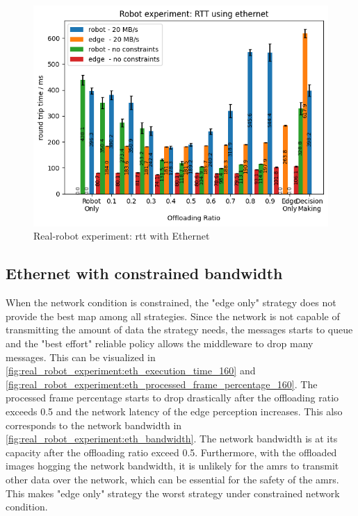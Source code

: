 \begin{figure}
    \centering
    \includegraphics[width=\linewidth]{figures/experiment/real_robot/eth/RTT.png}
    \caption{Real-robot experiment: \gls{rtt} with Ethernet}
    \label{fig:real_robot_experiment:eth_rtt}
\end{figure}

\subsection{Ethernet with constrained bandwidth}

When the network condition is constrained, the "edge only" strategy does not provide the best \gls{map} among all strategies. Since the network is not capable of transmitting the amount of data the strategy needs, the messages starts to queue and the "best effort" reliable policy allows the middleware to drop many messages. This can be visualized in \cref{fig:real_robot_experiment:eth_execution_time_160} and \cref{fig:real_robot_experiment:eth_processed_frame_percentage_160}. The processed frame percentage starts to drop drastically after the offloading ratio exceeds 0.5 and the network latency of the edge perception increases. This also corresponds to the network bandwidth in \cref{fig:real_robot_experiment:eth_bandwidth}. The network bandwidth is at its capacity after the offloading ratio exceed 0.5. Furthermore, with the offloaded images hogging the network bandwidth, it is unlikely for the \glspl{amr} to transmit other data over the network, which can be essential for the safety of the \glspl{amr}. This makes "edge only" strategy the worst strategy under constrained network condition. 


